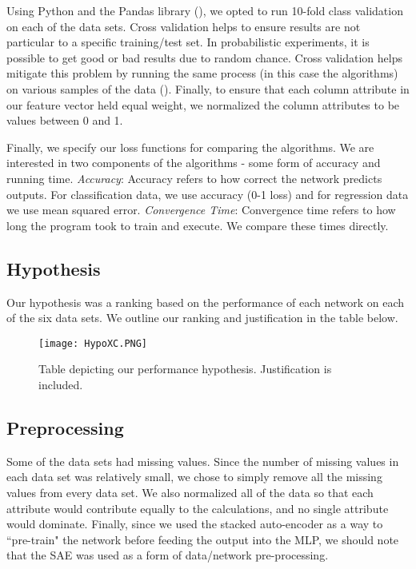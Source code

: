 \documentclass[twoside,11pt]{article}
\begin{document}
     Using Python and the Pandas library (\cite{McKinney:2010}), we opted to run 10-fold class validation on each of the data sets. Cross validation helps to ensure results are not particular to a specific training/test set. In probabilistic experiments, it is possible to get good or bad results due to random chance. Cross validation helps mitigate this problem by running the same process (in this case the algorithms) on various samples of the data (\cite{crossvalidation}). Finally, to ensure that each column attribute in our feature vector held equal weight, we normalized the column attributes to be values between 0 and 1.
     
     Finally, we specify our loss functions for comparing the algorithms. We are interested in two components of the algorithms - some form of accuracy and running time. \textit{Accuracy}: Accuracy refers to how correct the network predicts outputs. For classification data, we use accuracy (0-1 loss) and for regression data we use mean squared error. \textit{Convergence Time}: Convergence time refers to how long the program took to train and execute. We compare these times directly.
     
    \subsection{Hypothesis}
    
    Our hypothesis was a ranking based on the performance of each network on each of the six data sets. We outline our ranking and justification in the table below.
    
    \begin{figure}[h]
        \centering
        \texttt{[image: HypoXC.PNG]}
        \caption{Table depicting our performance hypothesis. Justification is included.}
        \label{fig:my_label}
    \end{figure}
    
    \subsection{Preprocessing}
    
    Some of the data sets had missing values. Since the number of missing values in each data set was relatively small, we chose to simply remove all the missing values from every data set. We also normalized all of the data so that each attribute would contribute equally to the calculations, and no single attribute would dominate. Finally, since we used the stacked auto-encoder as a way to ``pre-train" the network before feeding the output into the MLP, we should note that the SAE was used as a form of data/network pre-processing.
    
\end{document}
